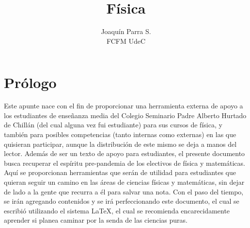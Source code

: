 \usepackage[spanish]{babel}
\usepackage[utf8]{inputenc}
\usepackage[a4paper,top=2.5cm,bottom=2.5cm,left=1.7cm,right=1.7cm]{geometry}
\usepackage{mdframed}
\usepackage{xcolor}
\usepackage{amsmath, amsfonts, amssymb}
\usepackage{tikz}
\usepackage{graphicx}
\graphicspath{{images/}}
\usepackage{cancel}
\usepackage{multirow}
\usepackage{hyperref}
\hypersetup{
    colorlinks=true,        %
    linkcolor=blue,         %
    urlcolor=cyan           %
}
\usepackage{appendix}

\title{\textbf{F\'isica}}
\author{Joaqu\'in Parra S. \\ FCFM UdeC}


\maketitle
\cleardoublepage
\frontmatter
\chapter*{Prólogo}  %
 Este apunte nace con el fin de proporcionar una herramienta externa de apoyo a los estudiantes de ense\~{n}anza media del Colegio 
 Seminario Padre Alberto Hurtado de Chill\'an (del cual alguna vez fui estudiante) para sus cursos de f\'isica, y tambi\'en para posibles
 competencias (tanto internas como externas) en las que quisieran participar, aunque la distribuci\'on de este mismo se deja a manos del lector.
 Adem\'as de ser un texto de apoyo para estudiantes, el presente documento busca recuperar el espíritu pre-pandemia de los electivos de f\'isica 
 y matem\'aticas. Aqu\'i se proporcionan herramientas que ser\'an de utilidad para estudiantes que quieran seguir un camino en las \'areas de 
 ciencias f\'isicas y matem\'aticas, sin dejar de lado a la gente que recurra a \'el para salvar una nota.
 Con el paso del tiempo, se ir\'an agregando contenidos y se ir\'a perfeccionando este documento, el cual se escribi\'o utilizando el sistema
 {\LaTeX}, el cual se recomienda encarecidamente aprender si planea caminar por la senda de las ciencias puras.
 \cleardoublepage
\tableofcontents
\mainmatter

